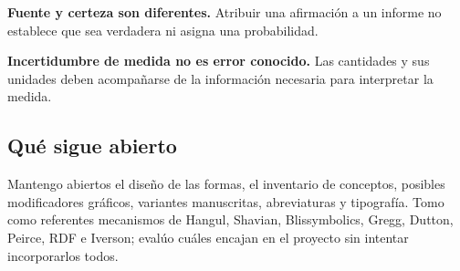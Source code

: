\textbf{Fuente y certeza son diferentes.} Atribuir una afirmación a un informe no establece que sea verdadera ni asigna una probabilidad.

\textbf{Incertidumbre de medida no es error conocido.} Las cantidades y sus unidades deben acompañarse de la información necesaria para interpretar la medida.

\subsection{Qué sigue abierto}

Mantengo abiertos el diseño de las formas, el inventario de conceptos, posibles
modificadores gráficos, variantes manuscritas, abreviaturas y tipografía.
Tomo como referentes mecanismos de Hangul, Shavian, Blissymbolics, Gregg,
Dutton, Peirce, RDF e Iverson; evalúo cuáles encajan en el proyecto sin intentar
incorporarlos todos.

